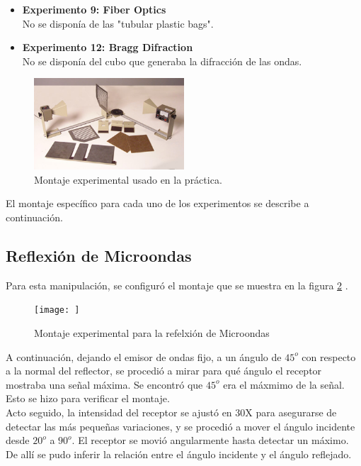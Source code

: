\documentclass[prb,aps,twocolumn,preprintnumbers,amsmath,amssymb]{revtex4}
\begin{document}
\begin{itemize}
	\item \textbf{Experimento 9: Fiber Optics} \\No se disponía de las "tubular plastic bags".
	
	\item \textbf{Experimento 12: Bragg Difraction} \\ No se disponía del cubo que generaba la difracción de las ondas.
\end{itemize}

\begin{figure}[h!]
	\centering
	\includegraphics[width=0.5\textwidth]{montaje}
	\caption{ Montaje experimental usado en la práctica. }
	\label{fig: montaje}
\end{figure}

El montaje específico para cada uno de los experimentos se describe a continuación.

\subsection{Reflexión de Microondas}
Para esta manipulación, se configuró el montaje que se muestra en la figura \ref{fig:reflexion} .\\

\begin{figure}[h!]
\centering
\texttt{[image: ]}
\caption{Montaje experimental para la refelxión de Microondas}
\label{fig:reflexion}
\end{figure}

A continuación, dejando el emisor de ondas fijo, a un ángulo de $45^o$ con respecto a la normal del reflector, se procedió a mirar para qué ángulo el receptor mostraba una señal máxima. Se encontró que $45^o$ era el máxmimo de la señal. Esto se hizo para verificar el montaje. \\

Acto seguido, la intensidad del receptor se ajustó en 30X para asegurarse de detectar las más pequeñas variaciones, y se procedió a mover el ángulo incidente desde $20^o$ a $90^o$. El receptor se movió angularmente hasta detectar un máximo. De allí se pudo inferir la relación entre el ángulo incidente y el ángulo reflejado.  \\
\end{document}
